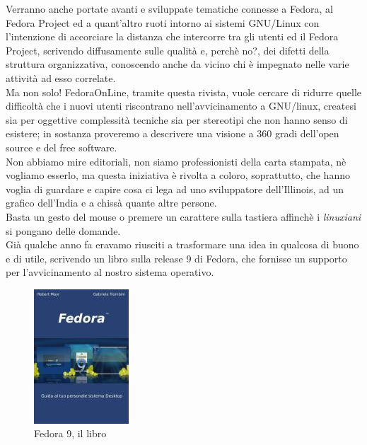Verranno anche portate avanti e sviluppate tematiche connesse a Fedora, al Fedora Project ed a quant'altro ruoti intorno ai sistemi GNU/Linux con l'intenzione di accorciare la distanza che intercorre tra gli utenti ed il Fedora Project, scrivendo diffusamente sulle qualità e, perchè no?, dei difetti della struttura organizzativa, conoscendo anche da vicino chi è impegnato nelle varie attività ad esso correlate.\\

Ma non solo! FedoraOnLine, tramite questa rivista, vuole cercare di ridurre quelle difficoltà che i nuovi utenti riscontrano nell'avvicinamento a GNU/linux, createsi sia per oggettive complessità tecniche sia per stereotipi che non hanno senso di esistere; in sostanza proveremo a descrivere una visione a 360 gradi dell'open source e del free software.\\

Non abbiamo mire editoriali, non siamo professionisti della carta stampata, nè vogliamo esserlo, ma questa iniziativa è rivolta a coloro, soprattutto, che hanno voglia di guardare e capire cosa ci lega ad uno sviluppatore dell'Illinois, ad un grafico dell'India e a chissà quante altre persone.\\

Basta un gesto del mouse o premere un carattere sulla tastiera affinchè i {\itshape linuxiani} si pongano delle domande.\\

Già qualche anno fa eravamo riusciti a trasformare una idea in qualcosa di buono e di utile, scrivendo un libro sulla release 9 di Fedora, che fornisse un supporto per l'avvicinamento al nostro sistema operativo.\\

\begin{figure}[htbp]
\centering
\includegraphics[scale=.55]{articoli/editoriale/immagini/libro_copertina.jpg}
\caption{Fedora 9, il libro\label{fig 2:Fedora 9, il libro}}
\end{figure}

